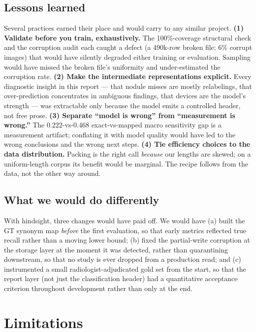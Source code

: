 \documentclass[11pt,a4paper]{article}
\begin{document}
\subsection{Lessons learned}
Several practices earned their place and would carry to any similar project. \textbf{(1) Validate before you train, exhaustively.} The 100\%-coverage structural check and the corruption audit each caught a defect (a 490k-row broken file; 6\% corrupt images) that would have silently degraded either training or evaluation. Sampling would have missed the broken file's uniformity and under-estimated the corruption rate. \textbf{(2) Make the intermediate representations explicit.} Every diagnostic insight in this report --- that nodule misses are mostly relabelings, that over-prediction concentrates in ambiguous findings, that devices are the model's strength --- was extractable only because the model emits a controlled header, not free prose. \textbf{(3) Separate ``model is wrong'' from ``measurement is wrong.''} The 0.222-vs-0.468 exact-vs-mapped macro sensitivity gap is a measurement artifact; conflating it with model quality would have led to the wrong conclusions and the wrong next steps. \textbf{(4) Tie efficiency choices to the data distribution.} Packing is the right call \emph{because} our lengths are skewed; on a uniform-length corpus its benefit would be marginal. The recipe follows from the data, not the other way around.

\subsection{What we would do differently}
With hindsight, three changes would have paid off. We would have (a) built the GT synonym map \emph{before} the first evaluation, so that early metrics reflected true recall rather than a moving lower bound; (b) fixed the partial-write corruption at the storage layer at the moment it was detected, rather than quarantining downstream, so that no study is ever dropped from a production read; and (c) instrumented a small radiologist-adjudicated gold set from the start, so that the report layer (not just the classification header) had a quantitative acceptance criterion throughout development rather than only at the end.

\section{Limitations}
\label{sec:limitations}
\end{document}
